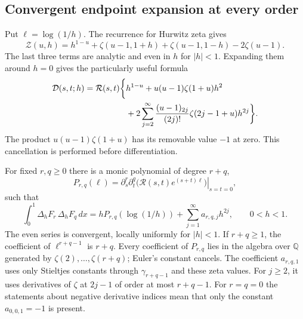 \subsection{Convergent endpoint expansion at every order}

Put $\ell=\log(1/h)$. The recurrence for Hurwitz zeta gives
\begin{equation}\label{eq:Z-split}
 \mathcal Z(u,h)=h^{1-u}+\zeta(u-1,1+h)+\zeta(u-1,1-h)-2\zeta(u-1).
\end{equation}
The last three terms are analytic and even in $h$ for $|h|<1$.
Expanding them around $h=0$ gives the particularly useful formula
\begin{align}
 \mathcal D(s,t;h)=\mathcal R(s,t)\biggl\{
 &h^{1-u}+u(u-1)\zeta(1+u)h^2\notag\\
 &+2\sum_{j=2}^{\infty}
   \frac{(u-1)_{2j}}{(2j)!}\zeta(2j-1+u)h^{2j}\biggr\}.
 \label{eq:convergent-expansion}
\end{align}
The product $u(u-1)\zeta(1+u)$ has its removable value $-1$ at zero.
This cancellation is performed before differentiation.

\begin{theorem}
\label{thm:cusp}
For fixed $r,q\geq0$ there is a monic polynomial of degree $r+q$,
\begin{equation}\label{eq:P-def}
 P_{r,q}(\ell)=
 \left.\partial_s^r\partial_t^q
     \bigl(\mathcal R(s,t)e^{(s+t)\ell}\bigr)\right|_{s=t=0},
\end{equation}
such that
\begin{equation}\label{eq:cusp}
 \int_0^1\Delta_hF_r\,\Delta_hF_q\,dx
   =hP_{r,q}(\log(1/h))+
           \sum_{j=1}^{\infty}a_{r,q,j}h^{2j},\qquad 0<h<1.
\end{equation}
The even series is convergent, locally uniformly for $|h|<1$.
If $r+q\geq1$, the coefficient of $\ell^{r+q-1}$ is $r+q$.
Every coefficient of $P_{r,q}$ lies in the algebra over $\mathbb Q$
generated by $\zeta(2),\ldots,\zeta(r+q)$; Euler's constant cancels.
The coefficient $a_{r,q,1}$ uses only Stieltjes constants through
$\gamma_{r+q-1}$ and these zeta values. For $j\geq2$, it uses
derivatives of $\zeta$ at $2j-1$ of order at most $r+q-1$.
For $r=q=0$ the statements about negative derivative indices mean that
only the constant $a_{0,0,1}=-1$ is present.
\end{theorem}

